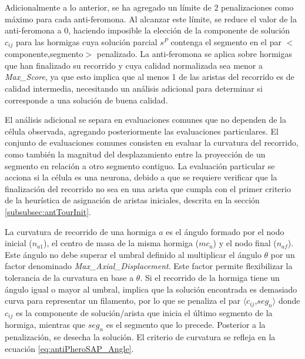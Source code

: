 Adicionalmente a lo anterior, se ha agregado un l\'imite de 2 penalizaciones como m\'aximo para cada anti-feromona. Al alcanzar este l\'imite, se reduce el valor de la anti-feromona a 0, haciendo imposible la elecci\'on de la componente de soluci\'on $c_{ij}$ para las hormigas cuya soluci\'on parcial $s^{P}$ contenga el segmento en el par $<$componente,segmento$>$ penalizado. La anti-feromona se aplica sobre hormigas que han finalizado su recorrido y cuya calidad normalizada sea menor a {\it Max\_Score}, ya que esto implica que al menos 1 de las aristas del recorrido es de calidad intermedia, necesitando un an\'alisis adicional para determinar si corresponde a una soluci\'on de buena calidad. 


El an\'alisis adicional se separa en evaluaciones comunes que no dependen de la c\'elula observada, agregando posteriormente las evaluaciones particulares. El conjunto de evaluaciones comunes consisten en evaluar la curvatura del recorrido, como tambi\'en la magnitud del desplazamiento entre la proyecci\'on de un segmento en relaci\'on a otro segmento contiguo. La evaluaci\'on particular se acciona si la c\'elula es una neurona, debido a que se requiere verificar que la finalizaci\'on del recorrido no sea en una arista que cumpla con el primer criterio de la heur\'istica de asignaci\'on de aristas iniciales, descrita en la secci\'on \ref{subsubsec:antTourInit}.

La curvatura de recorrido de una hormiga $a$ es el \'angulo formado por el nodo inicial ($n_{a1}$), el centro de masa de la misma hormiga ($mc_{a}$) y el nodo final ($n_{af}$). Este \'angulo no debe superar el umbral definido al multiplicar el \'angulo $\theta$ por un factor denominado {\it Max\_Axial\_Displacement}. Este factor permite flexibilizar la tolerancia de la curvatura en base a $\theta$. Si el recorrido de la hormiga tiene un \'angulo igual o mayor al umbral, implica que la soluci\'on encontrada es demasiado curva para representar un filamento, por lo que se penaliza el par $\langle c_{ij}$,$ seg_{n}\rangle$ donde $c_{ij}$ es la componente de soluci\'on/arista que inicia el \'ultimo segmento de la hormiga, mientras que $seg_{n}$ es el segmento que lo precede. Posterior a la penalizaci\'on, se desecha la soluci\'on. El criterio de curvatura se refleja en la ecuaci\'on \eqref{eq:antiPheroSAP_Angle}.

